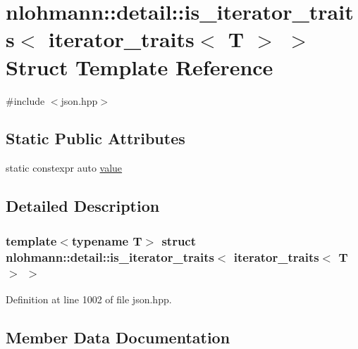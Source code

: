 \hypertarget{structnlohmann_1_1detail_1_1is__iterator__traits_3_01iterator__traits_3_01_t_01_4_01_4}{}\section{nlohmann\+::detail\+::is\+\_\+iterator\+\_\+traits$<$ iterator\+\_\+traits$<$ T $>$ $>$ Struct Template Reference}
\label{structnlohmann_1_1detail_1_1is__iterator__traits_3_01iterator__traits_3_01_t_01_4_01_4}


{\ttfamily \#include $<$json.\+hpp$>$}

\subsection*{Static Public Attributes}
\begin{DoxyCompactItemize}
\item 
static constexpr auto \mbox{\hyperlink{structnlohmann_1_1detail_1_1is__iterator__traits_3_01iterator__traits_3_01_t_01_4_01_4_ac2711760b352b8921accc6609957dc90}{value}}
\end{DoxyCompactItemize}


\subsection{Detailed Description}
\subsubsection*{template$<$typename T$>$\newline
struct nlohmann\+::detail\+::is\+\_\+iterator\+\_\+traits$<$ iterator\+\_\+traits$<$ T $>$ $>$}



Definition at line 1002 of file json.\+hpp.



\subsection{Member Data Documentation}
\mbox{\label{structnlohmann_1_1detail_1_1is__iterator__traits_3_01iterator__traits_3_01_t_01_4_01_4_ac2711760b352b8921accc6609957dc90}} 

